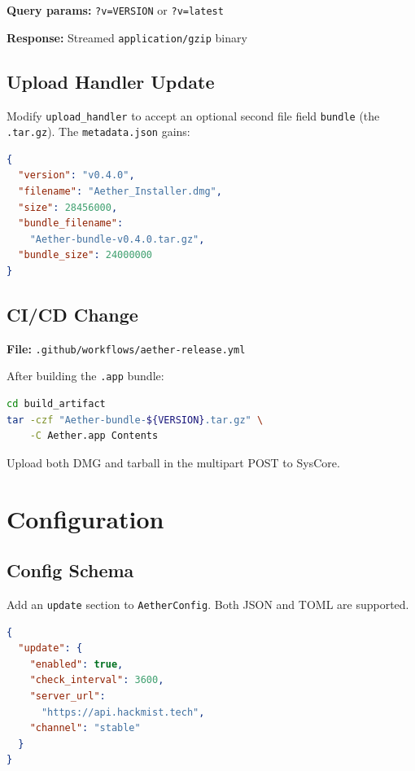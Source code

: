\documentclass[11pt, a4paper]{article}
\begin{document}
\textbf{Query params:} \texttt{?v=VERSION} or \texttt{?v=latest}

\textbf{Response:} Streamed \texttt{application/gzip} binary

\subsection{Upload Handler Update}

Modify \texttt{upload\_handler} to accept an optional second file field \texttt{bundle} (the \texttt{.tar.gz}). The \texttt{metadata.json} gains:

\begin{lstlisting}[language=json, title=Extended Metadata]
{
  "version": "v0.4.0",
  "filename": "Aether_Installer.dmg",
  "size": 28456000,
  "bundle_filename":
    "Aether-bundle-v0.4.0.tar.gz",
  "bundle_size": 24000000
}
\end{lstlisting}

\subsection{CI/CD Change}

\textbf{File:} \texttt{.github/workflows/aether-release.yml}

After building the \texttt{.app} bundle:
\begin{lstlisting}[language=bash]
cd build_artifact
tar -czf "Aether-bundle-${VERSION}.tar.gz" \
    -C Aether.app Contents
\end{lstlisting}

Upload both DMG and tarball in the multipart POST to SysCore.


\section{Configuration}
\label{sec:config}

\subsection{Config Schema}

Add an \texttt{update} section to \texttt{AetherConfig}. Both JSON and TOML are supported.

\begin{lstlisting}[language=json, title=JSON (~/.config/aether/config.json)]
{
  "update": {
    "enabled": true,
    "check_interval": 3600,
    "server_url":
      "https://api.hackmist.tech",
    "channel": "stable"
  }
}
\end{lstlisting}
\end{document}
